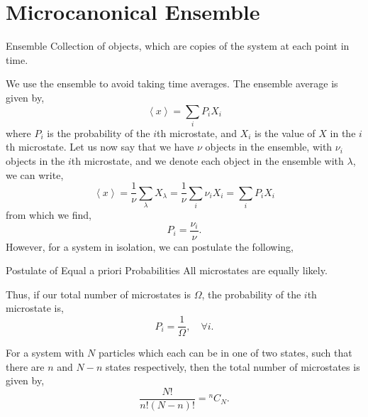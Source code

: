 \documentclass{book}
\newenvironment{aside}
{\begin{mdframed}[style=0,%
		leftline=false,rightline=false,leftmargin=2em,rightmargin=2em,%
		innerleftmargin=0pt,innerrightmargin=0pt,linewidth=0.75pt,%
		skipabove=7pt,skipbelow=7pt]\small}
	{\end{mdframed}}
\begin{document}
\section{Microcanonical Ensemble}
\begin{Definitions}{Ensemble}{}
	Collection of objects, which are copies of the system at each point in time. 
\end{Definitions}
We use the ensemble to avoid taking time averages. The ensemble average is given by,
\begin{equation}
	\left<x\right> = \sum_i P_iX_i
\end{equation}
where $P_i$ is the probability of the $i$th microstate, and $X_i$ is the value of $X$ in the $i$th microstate. Let us now say that we have $\nu$ objects in the ensemble, with $\nu_i$ objects in the $i$th microstate, and we denote each object in the ensemble with $\lambda$, we can write,
\begin{equation}
	\left<x\right>  = \frac{1}{\nu} \sum_{\lambda}X_{\lambda} = \frac{1}{\nu}\sum_i\nu_iX_i = \sum_i P_iX_i
\end{equation}
from which we find,
\begin{equation}
	P_i = \frac{\nu_i}{\nu}.
\end{equation}
However, for a system in isolation, we can postulate the following,
\begin{Postulates}{Postulate of Equal a priori Probabilities}{}
	All microstates are equally likely.
\end{Postulates}
Thus, if our total number of microstates is $\Omega$, the probability of the $i$th microstate is,
\begin{equation}
	P_i = \frac{1}{\Omega},\hspace{1em}\forall i.
\end{equation}
\begin{aside}
	For a system with $N$ particles which each can be in one of two states, such that there are $n$ and $N-n$ states respectively, then the total number of microstates is given by,
	\begin{equation}
		\frac{N!}{n!(N-n)!} = {^nC_N}.
	\end{equation}
\end{aside}
\end{document}

